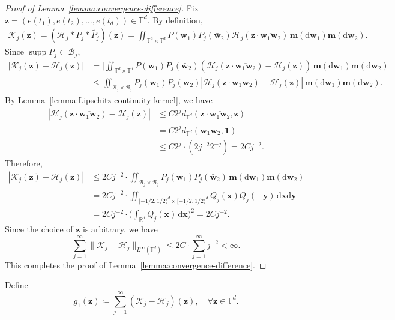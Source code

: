 \documentclass[12pt]{amsart}
\theoremstyle{definition}
\theoremstyle{remark}
\newcommand{\bz}{\boldsymbol{z}}
\newcommand{\bw}{\boldsymbol{w}}
\newcommand{\R}{\mathbb{R}}
\newcommand{\T}{\mathbb{T}}
\newcommand{\supp}{\operatorname{supp}}
\numberwithin{equation}{section}
\begin{document}
\begin{proof}[Proof of Lemma~\ref{lemma:convergence-difference}]
	Fix $\bz=(e(t_1),e(t_2),\ldots,e(t_d))\in \T^d$. By definition,
	\begin{align*}
	\mathcal{K}_j(\bz)=(\mathcal{H}_j*P_j*\widetilde{P_j})(\bz)=\iint_{\T^d\times \T^d} P(\bw_1)P_j(\bar{\bw}_2)\mathcal{H}_j(\bz\cdot\overline{\bw_1\bw_2})\,\boldsymbol{m}(\mathrm{d}\bw_1)\boldsymbol{m}(\mathrm{d}\bw_2).
	\end{align*}
    Since $\supp P_j\subset \mathcal{B}_j$, 
    \begin{align*} 
    \big|\mathcal{K}_j(\bz)-\mathcal{H}_j(\bz)\big|&=\bigg|\iint_{\T^d\times \T^d} P(\bw_1)P_j(\bar{\bw}_2)(\mathcal{H}_j(\bz\cdot\overline{\bw_1\bw_2})-\mathcal{H}_j(\bz))\,\boldsymbol{m}(\mathrm{d}\bw_1)\boldsymbol{m}(\mathrm{d}\bw_2)\bigg|\\
    &\le \iint_{\mathcal{B}_j\times \mathcal{B}_j}P_j(\bw_1)P_j(\bar{\bw}_2)|\mathcal{H}_j(\bz\cdot\overline{\bw_1\bw_2})-\mathcal{H}_j(\bz)|\,\boldsymbol{m}(\mathrm{d}\bw_1)\boldsymbol{m}(\mathrm{d}\bw_2).
    \end{align*}
    By Lemma~\ref{lemma:Lipschitz-continuity-kernel}, we have
    \begin{align*}
   |\mathcal{H}_j(\bz\cdot \overline{\bw_1\bw_2})-\mathcal{H}_j(\bz)|&\le C2^j d_{\T^d}(\bz\cdot \overline{\bw_1\bw_2},\bz)\\
   &=C2^jd_{\T^d}(\bw_1\bw_2,\boldsymbol{1})
   \\
   & \le C2^j\cdot (2j^{-2}2^{-j})=2Cj^{-2}.
	\end{align*}
    Therefore,
	\begin{align*}
	|\mathcal{K}_j(\bz)-\mathcal{H}_j(\bz)|&\le 2Cj^{-2}\cdot \iint_{\mathcal{B}_j\times \mathcal{B}_j} P_j(\bw_1)P_j(\bar{\bw}_2)\,\boldsymbol{m}(\mathrm{d}\bw_1)\boldsymbol{m}(\mathrm{d}\bw_2)\\
	&=2Cj^{-2}\cdot \iint_{[-1/2,1/2)^d\times [-1/2,1/2)^d} Q_j(\boldsymbol{x})Q_j(-\boldsymbol{y})\,\mathrm{d}\boldsymbol{x}\mathrm{d}\boldsymbol{y}\\
	&=2Cj^{-2}\cdot \bigg(\int_{\R^d} Q_j(\boldsymbol{x})\,\mathrm{d}\boldsymbol{x}\bigg)^2=2Cj^{-2}.
	\end{align*}
   Since the choice of $\bz$ is arbitrary, we have
    \[
    \sum_{j=1}^\infty \|\mathcal{K}_j-\mathcal{H}_j\|_{L^\infty(\T^d)}\le 2C\cdot \sum_{j=1}^\infty j^{-2}<\infty.
    \]
    This completes the proof of Lemma~\ref{lemma:convergence-difference}.
\end{proof}
Define
\[
g_1(\bz)\coloneq \sum_{j=1}^\infty (\mathcal{K}_j-\mathcal{H}_j)(\bz),\quad \forall \bz\in \T^d.
\]
\end{document}
